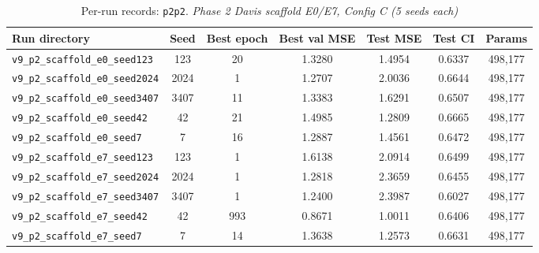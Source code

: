\begin{table}[!h]
\centering\scriptsize
\caption{Per-run records: \texttt{p2p2}. \textit{Phase 2 Davis scaffold E0/E7, Config C (5 seeds each)}}
\label{tab:v9_runs_p2p2}
\begin{tabular}{p{4.8cm}cccccc}
\toprule
Run directory & Seed & Best epoch & Best val MSE & Test MSE & Test CI & Params \\
\midrule
\texttt{v9\_\allowbreak{}p2\_\allowbreak{}scaffold\_\allowbreak{}e0\_\allowbreak{}seed123} & 123 & 20 & 1.3280 & 1.4954 & 0.6337 & 498,177 \\
\texttt{v9\_\allowbreak{}p2\_\allowbreak{}scaffold\_\allowbreak{}e0\_\allowbreak{}seed2024} & 2024 & 1 & 1.2707 & 2.0036 & 0.6644 & 498,177 \\
\texttt{v9\_\allowbreak{}p2\_\allowbreak{}scaffold\_\allowbreak{}e0\_\allowbreak{}seed3407} & 3407 & 11 & 1.3383 & 1.6291 & 0.6507 & 498,177 \\
\texttt{v9\_\allowbreak{}p2\_\allowbreak{}scaffold\_\allowbreak{}e0\_\allowbreak{}seed42} & 42 & 21 & 1.4985 & 1.2809 & 0.6665 & 498,177 \\
\texttt{v9\_\allowbreak{}p2\_\allowbreak{}scaffold\_\allowbreak{}e0\_\allowbreak{}seed7} & 7 & 16 & 1.2887 & 1.4561 & 0.6472 & 498,177 \\
\texttt{v9\_\allowbreak{}p2\_\allowbreak{}scaffold\_\allowbreak{}e7\_\allowbreak{}seed123} & 123 & 1 & 1.6138 & 2.0914 & 0.6499 & 498,177 \\
\texttt{v9\_\allowbreak{}p2\_\allowbreak{}scaffold\_\allowbreak{}e7\_\allowbreak{}seed2024} & 2024 & 1 & 1.2818 & 2.3659 & 0.6455 & 498,177 \\
\texttt{v9\_\allowbreak{}p2\_\allowbreak{}scaffold\_\allowbreak{}e7\_\allowbreak{}seed3407} & 3407 & 1 & 1.2400 & 2.3987 & 0.6027 & 498,177 \\
\texttt{v9\_\allowbreak{}p2\_\allowbreak{}scaffold\_\allowbreak{}e7\_\allowbreak{}seed42} & 42 & 993 & 0.8671 & 1.0011 & 0.6406 & 498,177 \\
\texttt{v9\_\allowbreak{}p2\_\allowbreak{}scaffold\_\allowbreak{}e7\_\allowbreak{}seed7} & 7 & 14 & 1.3638 & 1.2573 & 0.6631 & 498,177 \\
\bottomrule
\end{tabular}
\end{table}

